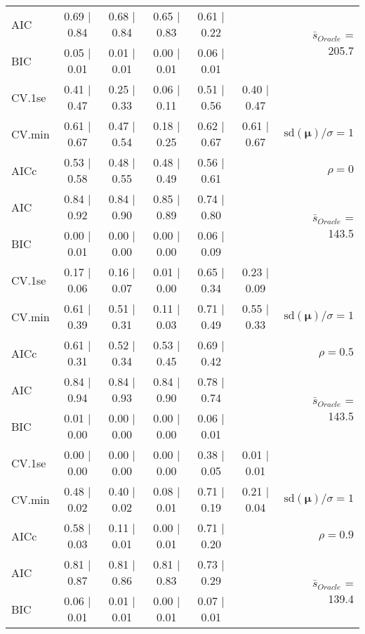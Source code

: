\begin{table}
\begin{center}
\begin{tabular}{l*{5}{c}|r}
AIC & 0.69 $\mid$ 0.84 & 0.68 $\mid$ 0.84 & 0.65 $\mid$ 0.83 & 0.61 $\mid$ 0.22 & &  \multirow{2}{*}{$\bar{s}_{Oracle}$ = 205.7} \\
BIC & 0.05 $\mid$ 0.01 & 0.01 $\mid$ 0.01 & 0.00 $\mid$ 0.01 & 0.06 $\mid$ 0.01 & &  \\
 \hline 
CV.1se & 0.41 $\mid$ 0.47 & 0.25 $\mid$ 0.33 & 0.06 $\mid$ 0.11 & 0.51 $\mid$ 0.56 & 0.40 $\mid$ 0.47 & \\
CV.min & 0.61 $\mid$ 0.67 & 0.47 $\mid$ 0.54 & 0.18 $\mid$ 0.25 & 0.62 $\mid$ 0.67 & 0.61 $\mid$ 0.67 &  $\mathrm{sd}(\mathbf{\mu})/\sigma=1$ \\
AICc & 0.53 $\mid$ 0.58 & 0.48 $\mid$ 0.55 & 0.48 $\mid$ 0.49 & 0.56 $\mid$ 0.61 & & $\rho=0$ \\
AIC & 0.84 $\mid$ 0.92 & 0.84 $\mid$ 0.90 & 0.85 $\mid$ 0.89 & 0.74 $\mid$ 0.80 & &  \multirow{2}{*}{$\bar{s}_{Oracle}$ = 143.5} \\
BIC & 0.00 $\mid$ 0.01 & 0.00 $\mid$ 0.00 & 0.00 $\mid$ 0.00 & 0.06 $\mid$ 0.09 & &  \\
 \hline 
CV.1se & 0.17 $\mid$ 0.06 & 0.16 $\mid$ 0.07 & 0.01 $\mid$ 0.00 & 0.65 $\mid$ 0.34 & 0.23 $\mid$ 0.09 & \\
CV.min & 0.61 $\mid$ 0.39 & 0.51 $\mid$ 0.31 & 0.11 $\mid$ 0.03 & 0.71 $\mid$ 0.49 & 0.55 $\mid$ 0.33 &  $\mathrm{sd}(\mathbf{\mu})/\sigma=1$ \\
AICc & 0.61 $\mid$ 0.31 & 0.52 $\mid$ 0.34 & 0.53 $\mid$ 0.45 & 0.69 $\mid$ 0.42 & & $\rho=0.5$ \\
AIC & 0.84 $\mid$ 0.94 & 0.84 $\mid$ 0.93 & 0.84 $\mid$ 0.90 & 0.78 $\mid$ 0.74 & &  \multirow{2}{*}{$\bar{s}_{Oracle}$ = 143.5} \\
BIC & 0.01 $\mid$ 0.00 & 0.00 $\mid$ 0.00 & 0.00 $\mid$ 0.00 & 0.06 $\mid$ 0.01 & &  \\
 \hline 
CV.1se & 0.00 $\mid$ 0.00 & 0.00 $\mid$ 0.00 & 0.00 $\mid$ 0.00 & 0.38 $\mid$ 0.05 & 0.01 $\mid$ 0.01 & \\
CV.min & 0.48 $\mid$ 0.02 & 0.40 $\mid$ 0.02 & 0.08 $\mid$ 0.01 & 0.71 $\mid$ 0.19 & 0.21 $\mid$ 0.04 &  $\mathrm{sd}(\mathbf{\mu})/\sigma=1$ \\
AICc & 0.58 $\mid$ 0.03 & 0.11 $\mid$ 0.01 & 0.00 $\mid$ 0.01 & 0.71 $\mid$ 0.20 & & $\rho=0.9$ \\
AIC & 0.81 $\mid$ 0.87 & 0.81 $\mid$ 0.86 & 0.81 $\mid$ 0.83 & 0.73 $\mid$ 0.29 & &  \multirow{2}{*}{$\bar{s}_{Oracle}$ = 139.4} \\
BIC & 0.06 $\mid$ 0.01 & 0.01 $\mid$ 0.01 & 0.00 $\mid$ 0.01 & 0.07 $\mid$ 0.01 & &  \\

\end{tabular}
\end{center}
\end{table}
